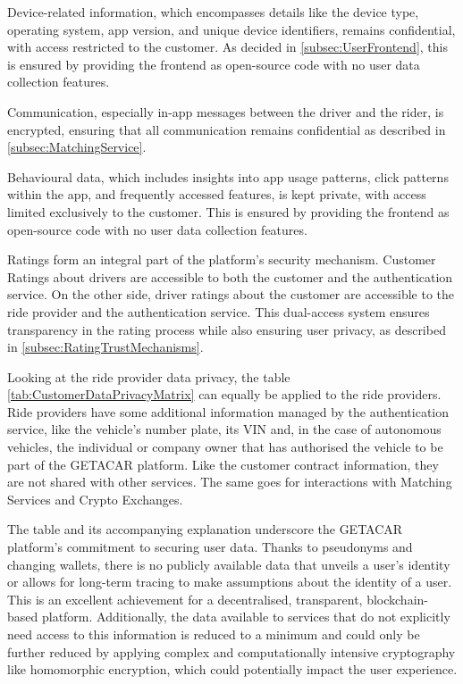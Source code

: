 Device-related information, which encompasses details like the device type, operating system, app version, and unique device identifiers, remains confidential, with access restricted to the customer. As decided in \ref{subsec:UserFrontend}, this is ensured by providing the frontend as open-source code with no user data collection features.

Communication, especially in-app messages between the driver and the rider, is encrypted, ensuring that all communication remains confidential as described in \ref{subsec:MatchingService}.

Behavioural data, which includes insights into app usage patterns, click patterns within the app, and frequently accessed features, is kept private, with access limited exclusively to the customer. This is ensured by providing the frontend as open-source code with no user data collection features.

Ratings form an integral part of the platform's security mechanism. Customer Ratings about drivers are accessible to both the customer and the authentication service. On the other side, driver ratings about the customer are accessible to the ride provider and the authentication service. This dual-access system ensures transparency in the rating process while also ensuring user privacy, as described in \ref{subsec:RatingTrustMechanisms}.

Looking at the ride provider data privacy, the table \ref{tab:CustomerDataPrivacyMatrix} can equally be applied to the ride providers. Ride providers have some additional information managed by the authentication service, like the vehicle's number plate, its VIN and, in the case of autonomous vehicles, the individual or company owner that has authorised the vehicle to be part of the GETACAR platform. Like the customer contract information, they are not shared with other services. The same goes for interactions with Matching Services and Crypto Exchanges.

The table and its accompanying explanation underscore the GETACAR platform's commitment to securing user data. Thanks to pseudonyms and changing wallets, there is no publicly available data that unveils a user's identity or allows for long-term tracing to make assumptions about the identity of a user. This is an excellent achievement for a decentralised, transparent, blockchain-based platform.  Additionally, the data available to services that do not explicitly need access to this information is reduced to a minimum and could only be further reduced by applying complex and computationally intensive cryptography like homomorphic encryption, which could potentially impact the user experience.

